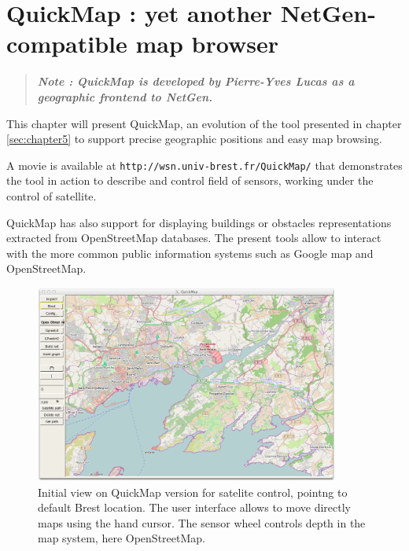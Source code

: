 
\chapter{QuickMap : yet another NetGen-compatible map browser}

\begin{quote}

{\sl \bf{Note :} QuickMap is developed by Pierre-Yves Lucas as a geographic frontend to NetGen.}

\end{quote}

\label{sec:chapter5bis}

This chapter will present QuickMap, an evolution of the tool presented in chapter \ref{sec:chapter5}
to support precise geographic positions and easy map  browsing. 

A movie is available at {\tt http://wsn.univ-brest.fr/QuickMap/} that demonstrates 
the tool in action to describe and control field of sensors,  working
under the control of satellite.

QuickMap has also support for displaying 
buildings or obstacles representations extracted from OpenStreetMap databases. 
The present tools allow to interact with the more common public information systems 
such as Google map and OpenStreetMap. 


\begin{figure}[hbtp]
\begin{center}
\includegraphics[width=10cm]{QuickMapSatBrest.png}
\caption{Initial view on QuickMap version for satelite control,
pointng to default Brest location. The user interface allows to move directly maps using
the hand cursor. The sensor wheel controls depth in the map system, here OpenStreetMap.}
\label{fig:initialQuickMapBrest}
\end{center}
\end{figure}

